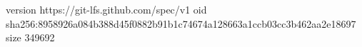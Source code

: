 version https://git-lfs.github.com/spec/v1
oid sha256:8958926a084b388d45f0882b91b1c74674a128663a1ccb03cc3b462aa2e18697
size 349692
